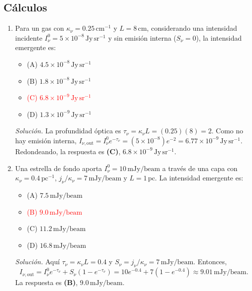 \documentclass[11pt]{article}
\begin{document}
\subsection{Cálculos}
\begin{enumerate}
    \item Para un gas con $\kappa_\nu=0.25\,\mathrm{cm}^{-1}$ y $L=8\,\mathrm{cm}$, considerando una intensidad incidente $I^0_\nu=5\times10^{-8}\,\mathrm{Jy\,sr^{-1}}$ y sin emisión interna ($S_\nu=0$), la intensidad emergente es:
    \begin{itemize}
        \item (A) $4.5\times10^{-8}\,\mathrm{Jy\,sr^{-1}}$
        \item (B) $1.8\times10^{-8}\,\mathrm{Jy\,sr^{-1}}$
        \item \textcolor{red}{(C) $6.8\times10^{-9}\,\mathrm{Jy\,sr^{-1}}$}
        \item (D) $1.3\times10^{-9}\,\mathrm{Jy\,sr^{-1}}$
    \end{itemize}
    \textit{Solución.} La profundidad óptica es $\tau_\nu=\kappa_\nu L=(0.25)(8)=2$. Como no hay emisión interna, $I_{\nu,\mathrm{out}}=I^0_\nu e^{-\tau_\nu}=(5\times10^{-8})e^{-2}=6.77\times10^{-9}\,\mathrm{Jy\,sr^{-1}}$. Redondeando, la respuesta es \textbf{(C)}, $6.8\times10^{-9}\,\mathrm{Jy\,sr^{-1}}$. \parencite[Secs. 13.3.1 y 13.7, pp. 394--395, 403--405]{chaparro2026}

    \item Una estrella de fondo aporta $I^0_\nu=10\,\mathrm{mJy/beam}$ a través de una capa con $\kappa_\nu=0.4\,\mathrm{pc}^{-1}$, $j_\nu/\kappa_\nu=7\,\mathrm{mJy/beam}$ y $L=1\,\mathrm{pc}$. La intensidad emergente es:
    \begin{itemize}
        \item (A) $7.5\,\mathrm{mJy/beam}$
        \item \textcolor{red}{(B) $9.0\,\mathrm{mJy/beam}$}
        \item (C) $11.2\,\mathrm{mJy/beam}$
        \item (D) $16.8\,\mathrm{mJy/beam}$
    \end{itemize}
    \textit{Solución.} Aquí $\tau_\nu=\kappa_\nu L=0.4$ y $S_\nu=j_\nu/\kappa_\nu=7\,\mathrm{mJy/beam}$. Entonces,
    \[
        I_{\nu,\mathrm{out}}=I^0_\nu e^{-\tau_\nu}+S_\nu(1-e^{-\tau_\nu})
        =10e^{-0.4}+7(1-e^{-0.4})\approx9.01\,\mathrm{mJy/beam}.
    \]
    La respuesta es \textbf{(B)}, $9.0\,\mathrm{mJy/beam}$. \parencite[Secs. 13.6--13.7, pp. 400--405]{chaparro2026}


\end{enumerate}
\end{document}
